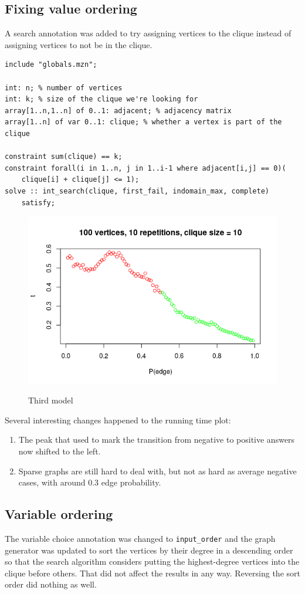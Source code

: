 \documentclass{article}
\theoremstyle{definition}
\begin{document}
\subsection{Fixing value ordering}
A search annotation was added to try assigning vertices to the clique instead of assigning vertices to not be in the clique.
\begin{lstlisting}
include "globals.mzn";

int: n; % number of vertices
int: k; % size of the clique we're looking for
array[1..n,1..n] of 0..1: adjacent; % adjacency matrix
array[1..n] of var 0..1: clique; % whether a vertex is part of the clique

constraint sum(clique) == k;
constraint forall(i in 1..n, j in 1..i-1 where adjacent[i,j] == 0)(
    clique[i] + clique[j] <= 1);
solve :: int_search(clique, first_fail, indomain_max, complete)
    satisfy;
\end{lstlisting}
\begin{figure}
  \includegraphics[scale=0.5]{max_clique3.png}
  \label{fig:third_max_clique}
  \caption{Third model}
\end{figure}
Several interesting changes happened to the running time plot:
\begin{enumerate}
\item The peak that used to mark the transition from negative to positive answers now shifted to the left.
\item Sparse graphs are still hard to deal with, but not as hard as average negative cases, with around 0.3 edge probability.
\end{enumerate}
\subsection{Variable ordering}
The variable choice annotation was changed to \texttt{input\_order} and the graph generator was updated to sort the vertices by their degree in a descending order so that the search algorithm considers putting the highest-degree vertices into the clique before others. That did not affect the results in any way. Reversing the sort order did nothing as well.
\end{document}
